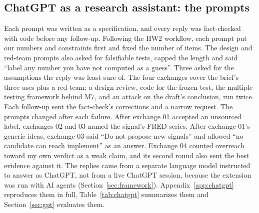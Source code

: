 \subsection{ChatGPT as a research assistant: the prompts}
\label{sec:prompts}

Each prompt was written as a specification, and every reply was fact-checked with code before any follow-up. Following the HW2 workflow, each prompt put our numbers and constraints first and fixed the number of items. The design and red-team prompts also asked for falsifiable tests, capped the length and said ``label any number you have not computed as a guess''. Three asked for the assumptions the reply was least sure of. The four exchanges cover the brief's three uses plus a red team: a design review, code for the frozen test, the multiple-testing framework behind M7, and an attack on the draft's conclusion, run twice. Each follow-up sent the fact-check's corrections and a narrow request. The prompts changed after each failure. After exchange 01 accepted an unsourced label, exchanges 02 and 03 named the signal's FRED series. After exchange 01's generic ideas, exchange 03 said ``Do not propose new signals'' and allowed ``no candidate can reach implement'' as an answer. Exchange 04 counted overreach toward my own verdict as a weak claim, and its second round also sent the best evidence against it. The replies came from a separate language model instructed to answer as ChatGPT, not from a live ChatGPT session, because the extension was run with AI agents (Section~\ref{sec:framework}). Appendix~\ref{app:chatgpt} reproduces them in full, Table~\ref{tab:chatgpt} summarizes them and Section~\ref{sec:gpt} evaluates them.

